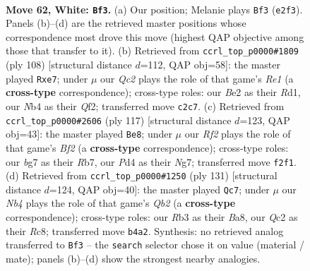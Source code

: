 \documentclass[11pt]{article}
\begin{document}
\clearpage

\begin{figure}[p]\centering
\begin{subfigure}{0.46\textwidth}\centering
\resizebox{\linewidth}{!}{%
\newchessgame
\chessboard[
  setfen={rn1qk2r/4n1b1/6p1/3p2P1/1N1P1P1p/1R5P/1BQ1BR1K/8 w - - 13 62},
  showmover=false,
  pgfstyle=straightmove, color=movearrow, markmove={e2-f3}
]}
\caption{}
\end{subfigure}\hfill
\begin{subfigure}{0.46\textwidth}\centering
\resizebox{\linewidth}{!}{%
\newchessgame
\chessboard[
  setfen={3q3k/1p1br1nr/3N1p2/2P2p2/p2P3P/P7/5Q1B/3RR1K1 w - - 2 55},
  showmover=false,
  pgfstyle=straightmove, color=movearrow, markmove={e1-e7}
]}
\caption{}
\end{subfigure}
\\[4pt]
\begin{subfigure}{0.46\textwidth}\centering
\resizebox{\linewidth}{!}{%
\newchessgame
\chessboard[
  setfen={6k1/1r2qbn1/4p2r/3pP3/3N4/1P1B2QP/2N3R1/1K6 b - - 22 59},
  showmover=false,
  pgfstyle=straightmove, color=movearrow, markmove={f7-e8}
]}
\caption{}
\end{subfigure}\hfill
\begin{subfigure}{0.46\textwidth}\centering
\resizebox{\linewidth}{!}{%
\newchessgame
\chessboard[
  setfen={b1r1n1k1/rq3p2/1p2p1pp/1P2P3/2PQN1P1/4R2P/3R4/5BK1 b - - 10 66},
  showmover=false,
  pgfstyle=straightmove, color=movearrow, markmove={b7-c7}
]}
\caption{}
\end{subfigure}
\caption{\textbf{Move 62, White: \texttt{Bf3}.} (a) Our position; Melanie plays \texttt{Bf3} (\texttt{e2f3}). Panels (b)--(d) are the retrieved master positions whose correspondence most drove this move (highest QAP objective among those that transfer to it). (b) Retrieved from \texttt{ccrl\_top\_p0000\#1809} (ply 108) [structural distance $d$=112, QAP obj=58]: the master played \texttt{Rxe7}; under $\mu$ our \emph{Qc2} plays the role of that game's \emph{Re1} (a \textbf{cross-type} correspondence); cross-type roles: our \emph{B}e2 as their \emph{R}d1, our \emph{N}b4 as their \emph{Q}f2; transferred move \texttt{c2c7}. (c) Retrieved from \texttt{ccrl\_top\_p0000\#2606} (ply 117) [structural distance $d$=123, QAP obj=43]: the master played \texttt{Be8}; under $\mu$ our \emph{Rf2} plays the role of that game's \emph{Bf2} (a \textbf{cross-type} correspondence); cross-type roles: our \emph{b}g7 as their \emph{R}b7, our \emph{P}d4 as their \emph{N}g7; transferred move \texttt{f2f1}. (d) Retrieved from \texttt{ccrl\_top\_p0000\#1250} (ply 131) [structural distance $d$=124, QAP obj=40]: the master played \texttt{Qc7}; under $\mu$ our \emph{Nb4} plays the role of that game's \emph{Qb2} (a \textbf{cross-type} correspondence); cross-type roles: our \emph{R}b3 as their \emph{B}a8, our \emph{Q}c2 as their \emph{R}c8; transferred move \texttt{b4a2}. Synthesis: no retrieved analog transferred to \texttt{Bf3} -- the \texttt{search} selector chose it on value (material / mate); panels (b)--(d) show the strongest nearby analogies.}
\label{fig:thought-m122}
\end{figure}
\end{document}
